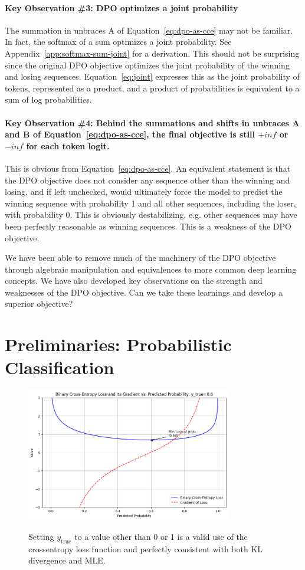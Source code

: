 \documentclass[twoside,11pt]{article}
\begin{document}
\paragraph{Key Observation \#3: DPO optimizes a joint probability}
The summation in unbraces A of Equation~\ref{eq:dpo-as-cce}
may not be familiar. In fact, the softmax of a sum optimizes a joint probability.
See Appendix~\ref{app:softmax-sum-joint}
for a derivation. 
This should not be surprising since the original DPO objective 
optimizes the joint probability of the winning and losing sequences. 
Equation~\ref{eq:joint} expresses this as the joint probability of 
tokens, represented as a product, and a product of 
probabilities is equivalent to a sum of log probabilities.

\paragraph{Key Observation \#4: Behind the summations and shifts
in unbraces A and B of Equation~\ref{eq:dpo-as-cce}, 
the final objective is still $+inf$ or $-inf$ for each token logit.} 
This
is obvious from Equation~\ref{eq:dpo-as-cce}. An equivalent statement is that
the DPO objective does not consider any sequence other than the
winning and losing, and if left unchecked, would ultimately force
the model to predict the winning sequence with probability 1 and all
other sequences, including the loser, with probability 0. This is obviously
destabilizing, e.g. other sequences may have been perfectly
reasonable as winning sequences. This is a weakness
of the DPO objective. 

We have been able to remove much of the machinery of the DPO objective 
through algebraic manipulation and equivalences to more common
deep learning concepts.
We have also developed key observations on the strength and weaknesses
of the DPO objective. Can we take these learnings 
and develop a superior objective? 


\section{Preliminaries: Probabilistic Classification}

\begin{figure}[htbp]
  \centering
  \includegraphics[width=0.8\textwidth]{ce06.png}
  \label{fig:ce06}
  \caption{Setting $y_\mathrm{true}$ to a value 
  other than 0 or 1 is a valid 
  use of the crossentropy loss 
  function and perfectly consistent with
  both KL divergence and MLE.}
\end{figure}
\end{document}
